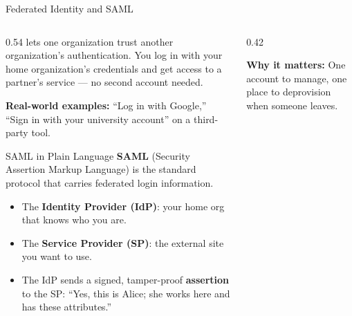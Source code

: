 \documentclass[aspectratio=169]{beamer}  %
\begin{document}
\begin{frame}{Federated Identity and SAML}
    \begin{columns}[T]
        \begin{column}{0.54\textwidth}
            \footnotesize
             lets one organization trust another organization's authentication. You log in with your home organization's credentials and get access to a partner's service --- no second account needed.

            \vspace{0.3em}
            \textbf{Real-world examples:} ``Log in with Google,'' ``Sign in with your university account'' on a third-party tool.

            \vspace{0.3em}
            \begin{block}{SAML in Plain Language}
                \footnotesize
                \textbf{SAML} (Security Assertion Markup Language) is the standard protocol that carries federated login information.
                \begin{itemize}
                    \item The \textbf{Identity Provider (IdP)}: your home org that knows who you are.
                    \item The \textbf{Service Provider (SP)}: the external site you want to use.
                    \item The IdP sends a signed, tamper-proof \textbf{assertion} to the SP: ``Yes, this is Alice; she works here and has these attributes.''
                \end{itemize}
            \end{block}
        \end{column}
        \begin{column}{0.42\textwidth}
            \begin{center}
            \end{center}
            \vspace{0.2em}
            \footnotesize
            \textbf{Why it matters:} One account to manage, one place to deprovision when someone leaves.
        \end{column}
    \end{columns}
\end{frame}
\end{document}
